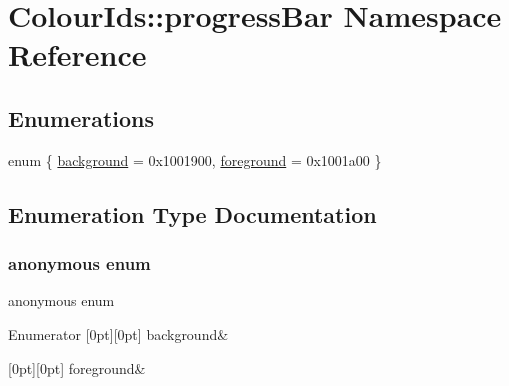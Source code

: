 \hypertarget{namespaceColourIds_1_1progressBar}{}\section{Colour\+Ids\+:\+:progress\+Bar Namespace Reference}
\label{namespaceColourIds_1_1progressBar}
\subsection*{Enumerations}
\begin{DoxyCompactItemize}
\item 
enum \{ \mbox{\hyperlink{namespaceColourIds_1_1progressBar_a3e02edbffa311e70e9c5e16bb3b2fa71ac7612e4d115858fd157c1af41584274e}{background}} = 0x1001900, 
\mbox{\hyperlink{namespaceColourIds_1_1progressBar_a3e02edbffa311e70e9c5e16bb3b2fa71a49c47b4ff0e2d467ad6574fddf88ca2b}{foreground}} = 0x1001a00
 \}
\end{DoxyCompactItemize}


\subsection{Enumeration Type Documentation}
\mbox{\label{namespaceColourIds_1_1progressBar_a3e02edbffa311e70e9c5e16bb3b2fa71}} 
\subsubsection{\texorpdfstring{anonymous enum}{anonymous enum}}
{\footnotesize\ttfamily anonymous enum}

\begin{DoxyEnumFields}{Enumerator}
[0pt][0pt]{}\mbox{\label{namespaceColourIds_1_1progressBar_a3e02edbffa311e70e9c5e16bb3b2fa71ac7612e4d115858fd157c1af41584274e}} 
background&\\
\hline

[0pt][0pt]{}\mbox{\label{namespaceColourIds_1_1progressBar_a3e02edbffa311e70e9c5e16bb3b2fa71a49c47b4ff0e2d467ad6574fddf88ca2b}} 
foreground&\\
\hline

\end{DoxyEnumFields}

